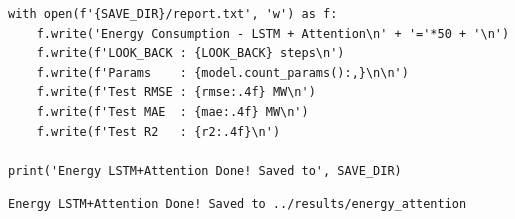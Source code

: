 \begin{lstlisting}[style=pythoncode, caption={Lưu báo cáo thực nghiệm}]
with open(f'{SAVE_DIR}/report.txt', 'w') as f:
    f.write('Energy Consumption - LSTM + Attention\n' + '='*50 + '\n')
    f.write(f'LOOK_BACK : {LOOK_BACK} steps\n')
    f.write(f'Params    : {model.count_params():,}\n\n')
    f.write(f'Test RMSE : {rmse:.4f} MW\n')
    f.write(f'Test MAE  : {mae:.4f} MW\n')
    f.write(f'Test R2   : {r2:.4f}\n')

print('Energy LSTM+Attention Done! Saved to', SAVE_DIR)
\end{lstlisting}

\begin{lstlisting}[style=consoleoutput, caption={Output: Báo cáo thực nghiệm}]
Energy LSTM+Attention Done! Saved to ../results/energy_attention
\end{lstlisting}
